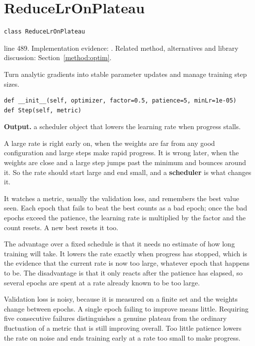 \section{ReduceLrOnPlateau}\label{fn:train:ReduceLrOnPlateau}
\begin{lstlisting}[style=sig]
class ReduceLrOnPlateau
\end{lstlisting}
 line 489. Implementation evidence: \cite{code2026}. Related method, alternatives and library discussion: Section~\ref{method:optim}.


Turn analytic gradients into stable parameter updates and manage training step sizes.


\begin{lstlisting}[style=plain]
def __init__(self, optimizer, factor=0.5, patience=5, minLr=1e-05)
def Step(self, metric)
\end{lstlisting}


\noindent\textbf{Output.} a scheduler object that lowers the learning rate when progress stalls.


A large rate is right early on, when the weights are far from any good configuration and large steps make rapid progress. It is wrong later, when the weights are close and a large step jumps past the minimum and bounces around it. So the rate should start large and end small, and a \textbf{scheduler} is what changes it.


It watches a metric, usually the validation loss, and remembers the best value seen. Each epoch that fails to beat the best counts as a bad epoch; once the bad epochs exceed the patience, the learning rate is multiplied by the factor and the count resets. A new best resets it too.


The advantage over a fixed schedule is that it needs no estimate of how long training will take. It lowers the rate exactly when progress has stopped, which is the evidence that the current rate is now too large, whatever epoch that happens to be. The disadvantage is that it only reacts after the patience has elapsed, so several epochs are spent at a rate already known to be too large.


Validation loss is noisy, because it is measured on a finite set and the weights change between epochs. A single epoch failing to improve means little. Requiring five consecutive failures distinguishes a genuine plateau from the ordinary fluctuation of a metric that is still improving overall. Too little patience lowers the rate on noise and ends training early at a rate too small to make progress.


